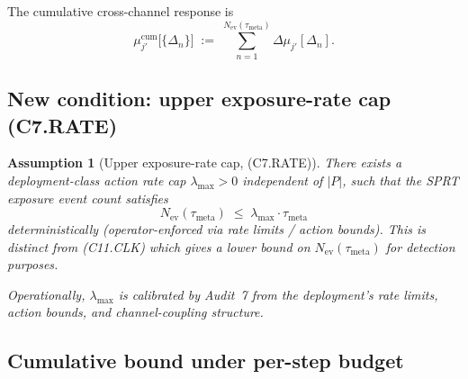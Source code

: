 \documentclass{article}
\newtheorem{assumption}{Assumption}
\newcommand{\Nev}{N_{\mathrm{ev}}}
\newcommand{\lammax}{\lambda_{\max}}
\newcommand{\taumeta}{\tau_{\mathrm{meta}}}
\begin{document}
The cumulative cross-channel response is
\[
  \mu_{j'}^{\mathrm{cum}}\big[\{\Delta_n\}\big]
  \;:=\; \sum_{n=1}^{\Nev(\taumeta)} \Delta\mu_{j'}[\Delta_n].
\]

\subsection{New condition: upper exposure-rate cap (C7.RATE)}

\begin{assumption}[Upper exposure-rate cap, (C7.RATE)]
\label{ass:c7-rate}
There exists a deployment-class action rate cap $\lammax > 0$
independent of $|P|$, such that the SPRT exposure event count
satisfies
\begin{equation}
\label{eq:c7-rate}
  \Nev(\taumeta) \;\leq\; \lammax \cdot \taumeta
\end{equation}
deterministically (operator-enforced via rate limits / action
bounds).  This is distinct from (C11.CLK) which gives a lower
bound on $\Nev(\taumeta)$ for detection purposes.

Operationally, $\lammax$ is calibrated by Audit~7 from the
deployment's rate limits, action bounds, and channel-coupling
structure.
\end{assumption}

\subsection{Cumulative bound under per-step budget}
\end{document}
